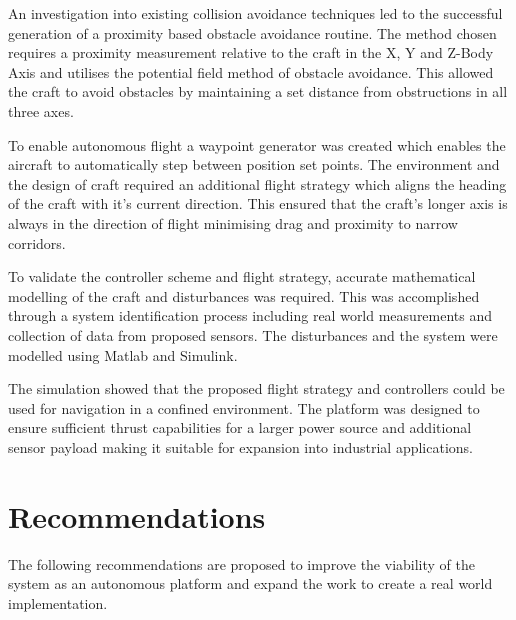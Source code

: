 	An investigation into existing collision avoidance techniques led to the successful generation of a proximity based obstacle avoidance routine. The method chosen requires a proximity measurement relative to the craft in the X, Y and Z-Body Axis and utilises the potential field method of obstacle avoidance. This allowed the craft to avoid obstacles by maintaining a set distance from obstructions in all three axes. 
	
	To enable autonomous flight a waypoint generator was created which enables the aircraft to automatically step between position set points. The environment and the design of craft required an additional flight strategy which aligns the heading of the craft with it's current direction. This ensured that the craft's longer axis is always in the direction of flight minimising drag and 
	proximity to narrow corridors.
	
	To validate the controller scheme and flight strategy, accurate mathematical modelling of the craft and disturbances was required. This was accomplished through a system identification process including real world measurements and collection of data from proposed sensors. The disturbances and the system were modelled using Matlab and Simulink.
		
	The simulation showed that the proposed flight strategy and controllers could be used for navigation in a confined environment. The platform was designed to ensure sufficient thrust capabilities for a larger power source and additional sensor payload making it suitable for expansion into industrial applications.
	
	\section{Recommendations}
	The following recommendations are proposed to improve the viability of the system as an autonomous platform and expand the work to create a real world implementation.
	
